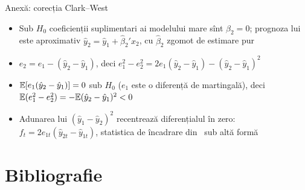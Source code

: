 \begin{frame}{Anexă: corecția Clark--West}
\hypertarget{atsapp3}{}
\itemsize{\small}
\begin{itemize}
    \item Sub $H_0$ coeficienții suplimentari ai modelului mare sînt $\beta_2 = 0$; prognoza lui este aproximativ $\hat y_2 = \hat y_1 + \hat\beta_2'x_{2}$, cu $\hat\beta_2$ zgomot de estimare pur
    \item $e_2 = e_1 - (\hat y_2 - \hat y_1)$, deci $e_1^2 - e_2^2 = 2e_1(\hat y_2 - \hat y_1) - (\hat y_2 - \hat y_1)^2$
    \item $\mathbb{E}[e_1(\hat y_2 - \hat y_1)] = 0$ sub $H_0$ ($e_1$ este o diferență de martingală), deci $\mathbb{E}(e_1^2 - e_2^2) = -\mathbb{E}(\hat y_2 - \hat y_1)^2 < 0$
    \item Adunarea lui $(\hat y_1 - \hat y_2)^2$ recentrează diferențialul în zero: $f_t = 2e_{1t}(\hat y_{2t} - \hat y_{1t})$, statistica de încadrare din \ sub altă formă
\end{itemize}
\end{frame}


\section{Bibliografie}

